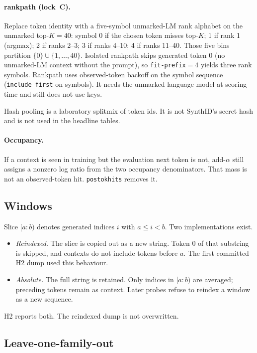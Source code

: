 \documentclass[11pt,a4paper]{article}
\theoremstyle{definition}
\newcommand{\Ktop}{K}
\begin{document}
\paragraph{rankpath (lock~C).}
Replace token identity with a five-symbol unmarked-LM rank alphabet on
the unmarked top-$\Ktop=40$:
symbol 0 if the chosen token misses top-$\Ktop$;
1 if rank 1 (argmax);
2 if ranks 2--3;
3 if ranks 4--10;
4 if ranks 11--40.
Those five bins partition $\{0\}\cup\{1,\ldots,40\}$. Isolated rankpath
skips generated token 0 (no unmarked-LM context without the prompt), so
\texttt{fit-prefix}${}=4$ yields three rank symbols. Rankpath uses
observed-token backoff on the symbol sequence
(\texttt{include\_first} on symbols). It needs the unmarked language
model at scoring time and still does not use keys.

Hash pooling is a laboratory splitmix of token ids. It is not SynthID's
secret hash and is not used in the headline tables.

\paragraph{Occupancy.}
If a context is seen in training but the evaluation next token is not,
add-$\alpha$ still assigns a nonzero log ratio from the two occupancy
denominators. That mass is not an observed-token hit.
\texttt{postokhits} removes it.

\subsection{Windows}
\label{sec:windows}

Slice $[a{:}b)$ denotes generated indices $i$ with $a\le i<b$. Two
implementations exist.

\begin{itemize}[leftmargin=*]
\item \emph{Reindexed.} The slice is copied out as a new string. Token 0
of that substring is skipped, and contexts do not include tokens before
$a$. The first committed H2 dump used this behaviour.
\item \emph{Absolute.} The full string is retained. Only indices in
$[a{:}b)$ are averaged; preceding tokens remain as context. Later
probes refuse to reindex a window as a new sequence.
\end{itemize}

H2 reports both. The reindexed dump is not overwritten.

\subsection{Leave-one-family-out}
\label{sec:loo}
\end{document}
